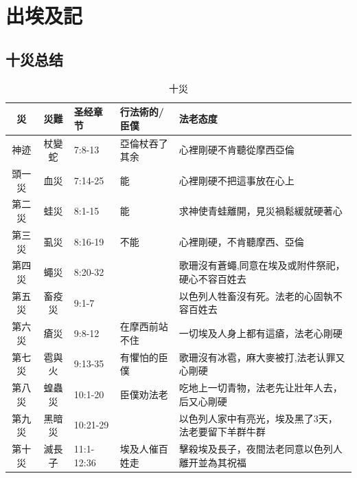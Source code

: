 \chapter{出埃及記}


\section{十災总结}
\begin{table}[H]
\centering
\begin{tabular}{|c|c|l|l|l|}
\hline
\hline
災 & 災難 & 圣经章节&行法術的/臣僕 &法老态度\\\hline
 神迹  &杖變蛇& 7:8-13&亞倫杖吞了其余&心裡剛硬不肯聽從摩西亞倫  \\\hline
頭一災&血災   & 7:14-25 &能&心裡剛硬不把這事放在心上  \\\hline
第二災&蛙災   & 8:1-15   &能&求神使青蛙離開，見災禍鬆緩就硬著心\\\hline
第三災&虱災   & 8:16-19 &不能&心裡剛硬，不肯聽摩西、亞倫 \\\hline
第四災&蠅災   & 8:20-32&&歌珊沒有蒼蠅,同意在埃及或附件祭祀，硬心不容百姓去　\\\hline
第五災&畜疫災&9:1-7　&&以色列人牲畜沒有死。法老的心固執不容百姓去 \\\hline
第六災&瘡災   & 9:8-12 &在摩西前站不住&一切埃及人身上都有這瘡，法老心剛硬\\\hline
第七災&雹與火& 9:13-35 &有懼怕的臣僕&歌珊沒有冰雹，麻大麥被打,法老认罪又心剛硬\\\hline
第八災&蝗蟲災& 10:1-20 &臣僕劝法老&吃地上一切青物，法老先让壯年人去，后又心剛硬\\\hline
第九災&黑暗災& 10:21-29 &&以色列人家中有亮光，埃及黑了3天，法老要留下羊群牛群\\\hline
第十災&滅長子& 11:1-12:36 &埃及人催百姓走&擊殺埃及長子，夜間法老同意以色列人離开並為其祝福\\\hline
\end{tabular}
\caption{十災}
\end{table}


